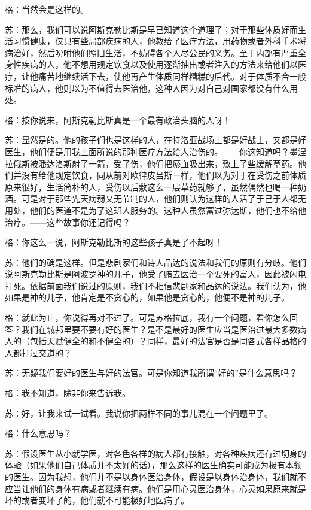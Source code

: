 \documentclass[11pt,oneside]{book}
\begin{document}
\begin{common-format}
格：当然会是这样的。

苏：那么，我们可以说阿斯克勒比斯是早已知道这个道理了；对于那些体质好而生活习惯健康，仅只有些局部疾病的人，他教给了医疗方法，用药物或者外科手术将病治好，然后吩咐他们照旧生活，不妨碍各个人尽公民的义务。至于内部有严重全身性疾病的人，他不想用规定饮食以及使用逐渐抽出或者注入的方法来给他们以医疗，让他痛苦地继续活下去，使他再产生体质同样糟糕的后代。对于体质不合一般标准的病人，他则以为不值得去医治他，这种人因为对自己对国家都没有什么用处。

格：按你说来，阿斯克勒比斯真是一个最有政治头脑的人呀！

苏：显然是的。他的孩子们也是这样的人，在特洛亚战场上都是好战士，又都是好医生，他们便是用我上面所说的那种医疗方法给人治伤的。——你这知道吗？墨涅拉俄斯被潘达洛斯射了一箭，受了伤，他们把瘀血吸出来，敷上了些缓解草药。他们并没有给他规定饮食，同从前对欧律皮吕斯一样，他们以为对于在受伤之前体质原来很好，生活简朴的人，受伤以后敷这么一层草药就够了，虽然偶然也喝一种奶酒。可是对于那些先天病弱又无节制的人，他们则认为这样的人活了于己于人都无用处，他们的医道不是为了这班人服务的。这种人虽然富过弥达斯，他们也不给他治疗。——这些故事你还记得吗？

格：你这么一说，阿斯克勒比斯的这些孩子真是了不起呀！

苏：他们的确是这样。但是悲剧家们和诗人品达的说法和我们的原则有分歧。他们说阿斯克勒比斯是阿波罗神的儿子，他受了贿去医治一个要死的富人，因此被闪电打死。依据前面我们说过的原则，我们不相信悲剧家和品达的说法。我们认为，他如果是神的儿子，他肯定是不贪心的，如果他是贪心的，他便不是神的儿子。

格：就此为止，你说得再对不过了。可是苏格拉底，我有一个问题，看你怎么回答？我们在城邦里要不要有好的医生？是不是最好的医生应当是医治过最大多数病人的（包括天赋健全的和不健全的）？同样，最好的法官是否是同各式各样品格的人都打过交道的？

苏：无疑我们要好的医生与好的法官。可是你知道我所谓“好的”是什么意思吗？

格：我不知道，除非你来告诉我。

苏：好，让我来试一试看。我说你把两样不同的事儿混在一个问题里了。

格：什么意思吗？

苏：假设医生从小就学医，对各色各样的病人都有接触，对各种疾病还有过切身的体验（如果他们自己体质并不太好的话），那么这样的医生确实可能成为极有本领的医生。因为我想，他们并不是以身体医治身体，假设是以身体治身体，我们就不应当让他们的身体有病或者继续有病。他们是用心灵医治身体，心灵如果原来就是坏的或者变坏了的，他们就不可能极好地医病了。


\end{common-format}
\end{document}
